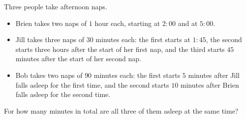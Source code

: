 Three people take afternoon naps.
\begin{itemize}
\item Brien takes two naps of $1$ hour each, starting at $2\!:\!00$ and at $5\!:\!00$.
\item Jill takes three naps of $30$ minutes each: the first starts at $1\!:\!45$, the second starts three hours after the start of her first nap, and the third starts $45$ minutes after the start of her second nap.
\item Bob takes two naps of $90$ minutes each: the first starts $5$ minutes after Jill falls asleep for the first time, and the second starts $10$ minutes after Brien falls asleep for the second time.
\end{itemize}
For how many minutes in total are all three of them asleep at the same time?
